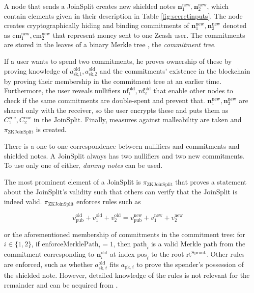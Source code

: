 \documentclass{article}
\begin{document}
A node that sends a JoinSplit creates new shielded notes $\boldsymbol{n}^\text{new}_1,\boldsymbol{n}^\text{new}_2$, which contain elements given in their description in Table \ref{fig:secretinputs}.
The node creates cryptographically hiding and binding commitments of $\boldsymbol{n}^\text{new}_1,\boldsymbol{n}^\text{new}_2$ denoted as $\text{cm}_1^\text{new}, {\text{cm}_2^\text{new}}$ that represent money sent to one Zcash user.
The commitments are stored in the leaves of a binary Merkle tree \cite{merkle:tree}, the \textit{commitment tree}.

If a user wants to spend two commitments, he proves ownership of these by proving knowledge of $a_\text{sk,$1$}^\text{old}, a_\text{sk,$2$}^\text{old}$ and the commitments' existence in the blockchain by proving their membership in the commitment tree at an earlier time.
Furthermore, the user reveals nullifiers $\text{nf}_1^\text{old}, {\text{nf}_2^\text{old}}$ that enable other nodes to check if the same commitments are double-spent and prevent that.
$\boldsymbol{n}^\text{new}_1,\boldsymbol{n}^\text{new}_2$ are shared only with the receiver, so the user encrypts these and puts them as $C_1^\text{enc}, C_2^\text{enc}$ in the JoinSplit.
Finally, measures against malleability are taken and $\pi_\text{ZKJoinSplit}$ is created.

There is a one-to-one correspondence between nullifiers and commitments and shielded notes.
A JoinSplit always has two nullifiers and two new commitments.
To use only one of either, \textit{dummy notes} can be used.

The most prominent element of a JoinSplit is $\pi_\text{ZKJoinSplit}$ that proves a statement about the JoinSplit's validity such that others can verify that the JoinSplit is indeed valid.
$\pi_\text{ZKJoinSplit}$ enforces rules such as

\[v_\text{pub}^\text{old} + v_1^\text{old} + v_2^\text{old} = v_\text{pub}^\text{new} + v_1^\text{new} + v_2^\text{new}\]

or the aforementioned membership of commitments in the commitment tree: for $i \in \{1,2\}$, if $\text{enforceMerklePath}_i = 1$, then $\text{path}_i$ is a valid Merkle path from the commitment corresponding to $\boldsymbol{n}_i^\text{old}$ at index $\text{pos}_i$ to the root $\text{rt}^\text{Sprout}$.
Other rules are enforced, such as whether $a^\text{old}_{\text{sk},i}$ fits $a_{\text{pk},i}$ to prove the spender's possession of the shielded note. However, detailed knowledge of the rules is not relevant for the remainder and can be acquired from \cite{hopwood:zcash}.
\end{document}
